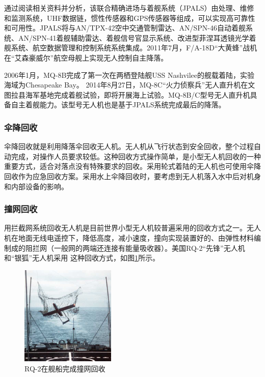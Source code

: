 通过阅读相关资料并分析，该联合精确进场与着舰系统（JPALS）由处理、维修和监测系统，UHF数据链，惯性传感器和GPS传感器等组成，可以实现高可靠性和可用性。JPALS将与AN/TPX-42空中交通管制雷达、AN/SPN-46自动着舰系统、AN/SPN-41着舰辅助雷达、着舰信号官显示系统、改进型菲涅耳透镜光学着舰系统、航空数据管理和控制系统系统集成。2011年7月，F/A-18D“大黄蜂”战机在“艾森豪威尔”航空母舰上实现无人控制自主降落。

2006年1月，MQ-8B完成了第一次在两栖登陆舰USS Nashvilee的舰载着陆，实验海域为Chesapeake Bay。	2014年8月27日，MQ-8C“火力侦察兵”无人直升机在文图拉县海军基地完成着舰试验，即将开展海上试验。MQ-8B/C型号无人直升机具备自主着舰能力。该型号无人机也是基于JPALS系统完成最后的降落。
\subsubsection{伞降回收}
伞降回收就是利用降落伞回收无人机。无人机从飞行状态到安全回收，整个过程自动完成，对操作人员要求较低。这种回收方式操作简单，是小型无人机回收的一种重要方式，适合对落点没有特殊要求的回收。采用轮式着陆的无人机也可使用伞降回收作为应急回收方案。采用水上伞降回收时，要考虑到无人机落入水中后对机身和内部设备的影响。

\subsubsection{撞网回收}
用拦截网系统回收无人机是目前世界小型无人机较普遍采用的回收方式之一。无人机在地面无线电遥控下，降低高度，减小速度，撞向实现装置好的、由弹性材料编制成的阻拦网（一般网的两端还连接有能量吸收器）。美国RQ-2“先锋”无人机和“银狐”无人机采用
这种回收方式，如图\ref{fig:34_RQ2_Pioneer_Landing}所示。
\begin{figure}[!tb]   
	\centering	
	\includegraphics[width=0.4\textwidth]{Figs/34_RQ2_Pioneer_Landing.jpg}
	\caption{RQ-2在舰船完成撞网回收}
	\label{fig:34_RQ2_Pioneer_Landing}
\end{figure}


